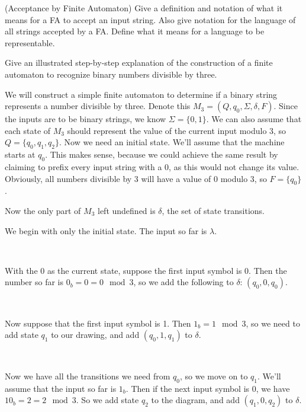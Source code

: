 \documentclass{bcthesis}
\newenvironment{exstep}[1]
		{
			\begin{minipage}{0.5 \textwidth}
				#1
			\end{minipage} \begin{minipage}{0.5 \paperwidth}
		}
		{
			\end{minipage}\\[0.5 em]
		}
\begin{document}
	\begin{definition}(Acceptance by Finite Automaton)
		Give a definition and notation of what it means for a FA to accept an input string.
		Also give notation for the language of all strings accepted by a FA.
		Define what it means for a language to be representable.
	\end{definition}

	\begin{example}
		Give an illustrated step-by-step explanation of the construction of a finite automaton to recognize binary numbers divisible by three.

		We will construct a simple finite automaton to determine if a binary string represents a number divisible by three.
	Denote this $M_3 = (Q, q_0, \Sigma, \delta, F)$.
	Since the inputs are to be binary strings, we know $\Sigma = \{ 0, 1 \}$.
	We can also assume that each state of $M_3$ should represent the value of the current input modulo 3, so $Q = \{q_0, q_1, q_2\}$.
	Now we need an initial state. 
	We'll assume that the machine starts at $q_0$. 
	This makes sense, because we could achieve the same result by claiming to prefix every input string with a 0, as this would not change its value.
	Obviously, all numbers divisible by 3 will have a value of 0 modulo 3, so $F = \{q_0\}$.

	Now the only part of $M_3$ left undefined is $\delta$, the set of state transitions.

		\begin{exstep}
			{
				We begin with only the initial state.
				The input so far is $\lambda$.
			}
			
		\end{exstep}

		\begin{exstep}
			{
				With the 0 as the current state, suppose the first input symbol is 0. 
				Then the number so far is $0_b = 0 = 0 \mod 3$, so we add the following to $\delta$: $(q_0, 0, q_0)$.
			}
			
		\end{exstep}

		\begin{exstep}
			{
				Now suppose that the first input symbol is 1. 
				Then $1_b = 1 \mod 3$, so we need to add state $q_1$ to our drawing, and add $(q_0, 1, q_1)$ to $\delta$.
			}
			
		\end{exstep}

		\begin{exstep}
			{
				Now we have all the transitions we need from $q_0$, so we move on to $q_1$.
				We'll assume that the input so far is $1_b$.
				Then if the next input symbol is $0$, we have $10_b = 2 = 2 \mod 3$.
				So we add state $q_2$ to the diagram, and add $(q_1, 0, q_2)$ to $\delta$.
			}
			
		\end{exstep}


\end{example}
\end{document}
